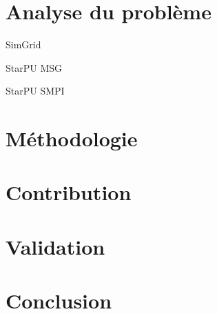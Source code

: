 \documentclass[11pt,xcolor=dvipsnames,presentation]{beamer}
\begin{document}
\section{Analyse du problème}
\label{sec-4}
\begin{frame}[label=sec-4-1]{SimGrid}
\end{frame}
\begin{frame}[label=sec-4-2]{StarPU MSG}
\end{frame}
\begin{frame}[label=sec-4-3]{StarPU SMPI}
\end{frame}

\section{Méthodologie}
\label{sec-5}
\section{Contribution}
\label{sec-6}
\section{Validation}
\label{sec-7}
\section{Conclusion}
\label{sec-8}
\end{document}
